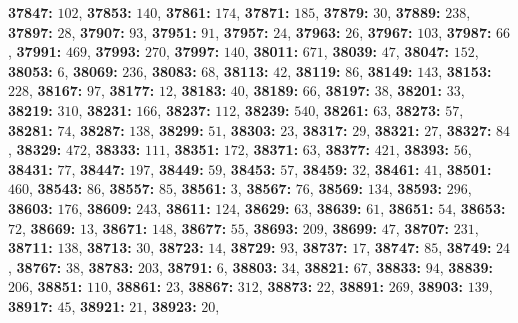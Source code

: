 \textsf{\bfseries 37847:} $102$, \textsf{\bfseries 37853:} $140$, \textsf{\bfseries 37861:} $174$, \textsf{\bfseries 37871:} $185$, \textsf{\bfseries 37879:} $30$, \textsf{\bfseries 37889:} $238$, \textsf{\bfseries 37897:} $28$, \textsf{\bfseries 37907:} $93$, \textsf{\bfseries 37951:} $91$, \textsf{\bfseries 37957:} $24$, \textsf{\bfseries 37963:} $26$, \textsf{\bfseries 37967:} $103$, \textsf{\bfseries 37987:} $66$, \textsf{\bfseries 37991:} $469$, \textsf{\bfseries 37993:} $270$, \textsf{\bfseries 37997:} $140$, \textsf{\bfseries 38011:} $671$, \textsf{\bfseries 38039:} $47$, \textsf{\bfseries 38047:} $152$, \textsf{\bfseries 38053:} $6$, \textsf{\bfseries 38069:} $236$, \textsf{\bfseries 38083:} $68$, \textsf{\bfseries 38113:} $42$, \textsf{\bfseries 38119:} $86$, \textsf{\bfseries 38149:} $143$, \textsf{\bfseries 38153:} $228$, \textsf{\bfseries 38167:} $97$, \textsf{\bfseries 38177:} $12$, \textsf{\bfseries 38183:} $40$, \textsf{\bfseries 38189:} $66$, \textsf{\bfseries 38197:} $38$, \textsf{\bfseries 38201:} $33$, \textsf{\bfseries 38219:} $310$, \textsf{\bfseries 38231:} $166$, \textsf{\bfseries 38237:} $112$, \textsf{\bfseries 38239:} $540$, \textsf{\bfseries 38261:} $63$, \textsf{\bfseries 38273:} $57$, \textsf{\bfseries 38281:} $74$, \textsf{\bfseries 38287:} $138$, \textsf{\bfseries 38299:} $51$, \textsf{\bfseries 38303:} $23$, \textsf{\bfseries 38317:} $29$, \textsf{\bfseries 38321:} $27$, \textsf{\bfseries 38327:} $84$, \textsf{\bfseries 38329:} $472$, \textsf{\bfseries 38333:} $111$, \textsf{\bfseries 38351:} $172$, \textsf{\bfseries 38371:} $63$, \textsf{\bfseries 38377:} $421$, \textsf{\bfseries 38393:} $56$, \textsf{\bfseries 38431:} $77$, \textsf{\bfseries 38447:} $197$, \textsf{\bfseries 38449:} $59$, \textsf{\bfseries 38453:} $57$, \textsf{\bfseries 38459:} $32$, \textsf{\bfseries 38461:} $41$, \textsf{\bfseries 38501:} $460$, \textsf{\bfseries 38543:} $86$, \textsf{\bfseries 38557:} $85$, \textsf{\bfseries 38561:} $3$, \textsf{\bfseries 38567:} $76$, \textsf{\bfseries 38569:} $134$, \textsf{\bfseries 38593:} $296$, \textsf{\bfseries 38603:} $176$, \textsf{\bfseries 38609:} $243$, \textsf{\bfseries 38611:} $124$, \textsf{\bfseries 38629:} $63$, \textsf{\bfseries 38639:} $61$, \textsf{\bfseries 38651:} $54$, \textsf{\bfseries 38653:} $72$, \textsf{\bfseries 38669:} $13$, \textsf{\bfseries 38671:} $148$, \textsf{\bfseries 38677:} $55$, \textsf{\bfseries 38693:} $209$, \textsf{\bfseries 38699:} $47$, \textsf{\bfseries 38707:} $231$, \textsf{\bfseries 38711:} $138$, \textsf{\bfseries 38713:} $30$, \textsf{\bfseries 38723:} $14$, \textsf{\bfseries 38729:} $93$, \textsf{\bfseries 38737:} $17$, \textsf{\bfseries 38747:} $85$, \textsf{\bfseries 38749:} $24$, \textsf{\bfseries 38767:} $38$, \textsf{\bfseries 38783:} $203$, \textsf{\bfseries 38791:} $6$, \textsf{\bfseries 38803:} $34$, \textsf{\bfseries 38821:} $67$, \textsf{\bfseries 38833:} $94$, \textsf{\bfseries 38839:} $206$, \textsf{\bfseries 38851:} $110$, \textsf{\bfseries 38861:} $23$, \textsf{\bfseries 38867:} $312$, \textsf{\bfseries 38873:} $22$, \textsf{\bfseries 38891:} $269$, \textsf{\bfseries 38903:} $139$, \textsf{\bfseries 38917:} $45$, \textsf{\bfseries 38921:} $21$, \textsf{\bfseries 38923:} $20$, 
